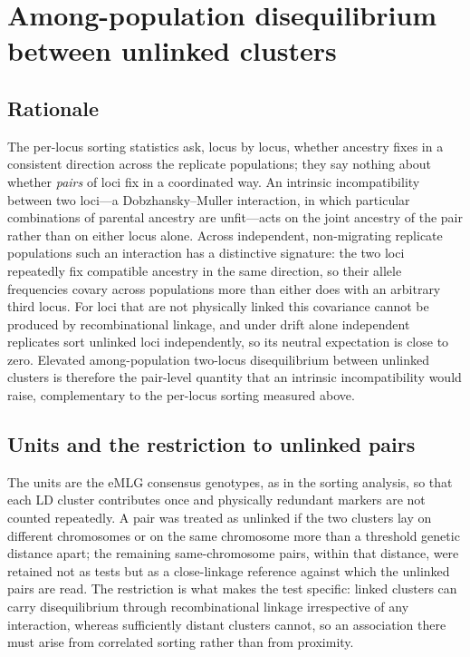 \documentclass[11pt]{article}
\begin{document}
\section{Among-population disequilibrium between unlinked clusters}
\label{sec:intrinsic}

\subsection{Rationale}
The per-locus sorting statistics ask, locus by locus, whether ancestry fixes in a
consistent direction across the replicate populations; they say nothing about
whether \emph{pairs} of loci fix in a coordinated way. An intrinsic incompatibility
between two loci---a Dobzhansky--Muller interaction, in which particular
combinations of parental ancestry are unfit---acts on the joint ancestry of the
pair rather than on either locus alone. Across independent, non-migrating
replicate populations such an interaction has a distinctive signature: the two
loci repeatedly fix compatible ancestry in the same direction, so their allele
frequencies covary across populations more than either does with an arbitrary
third locus. For loci that are not physically linked this covariance cannot be
produced by recombinational linkage, and under drift alone independent replicates
sort unlinked loci independently, so its neutral expectation is close to zero.
Elevated among-population two-locus disequilibrium between unlinked clusters is
therefore the pair-level quantity that an intrinsic incompatibility would raise,
complementary to the per-locus sorting measured above.

\subsection{Units and the restriction to unlinked pairs}
The units are the eMLG consensus genotypes, as in the sorting analysis, so that
each LD cluster contributes once and physically redundant markers are not counted
repeatedly. A pair was treated as unlinked if the two clusters lay on different
chromosomes or on the same chromosome more than a threshold genetic distance apart;
the remaining same-chromosome pairs, within that distance, were retained not as
tests but as a close-linkage reference against which the unlinked pairs are read.
The restriction is what makes the test specific: linked clusters can carry
disequilibrium through recombinational linkage irrespective of any interaction,
whereas sufficiently distant clusters cannot, so an association there must arise
from correlated sorting rather than from proximity.
\end{document}
